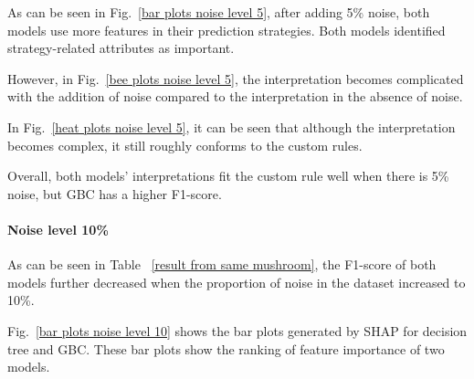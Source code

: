 \documentclass[runningheads,a4paper]{llncs}
\begin{document}
As can be seen in Fig.~\ref{bar plots noise level 5}, after adding 5\% noise, both models use more features in their prediction strategies. Both models identified strategy-related attributes as important.

However, in Fig.~\ref{bee plots noise level 5}, the interpretation becomes complicated with the addition of noise compared to the interpretation in the absence of noise.

In Fig.~\ref{heat plots noise level 5}, it can be seen that although the interpretation becomes complex, it still roughly conforms to the  custom rules.

Overall, both models' interpretations fit the custom rule well when there is 5\% noise, but GBC has a higher F1-score.
\paragraph{Noise level 10\%}
As can be seen in Table  ~\ref{result from same mushroom}, the F1-score of both models further decreased when the proportion of noise in the dataset increased to 10\%.

Fig.~\ref{bar plots noise level 10} shows the bar plots generated by SHAP for decision tree and GBC. These bar plots show the ranking of feature importance of two models.
\end{document}
